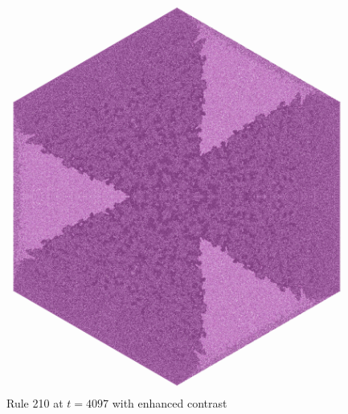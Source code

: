 \documentclass{article}
\begin{document}
\begin{figure}[H]
    \centering
    \includegraphics[width=.85\textwidth]{graphics/behavior/rule-210/rule-210-time-4097-contrast.jpg}
    \caption{Rule 210 at $t=4097$ with enhanced contrast}
    \label{fig:rule-210-time-4097}
\end{figure}
\end{document}
